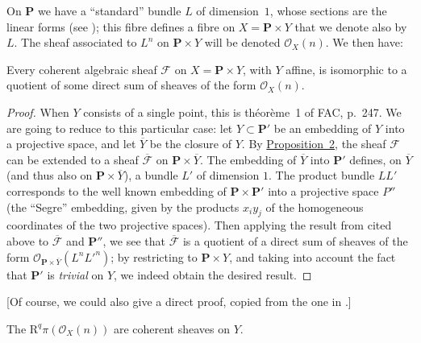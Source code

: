 \documentclass{article}
\theoremstyle{plain}
\newenvironment{lemma}[1]
    {\renewcommand\theinnerlemma{#1}\innerlemma}
    {\endinnerlemma}
\theoremstyle{definition}
\newcommand{\scr}[1]{{\mathscr{#1}}}
\newcommand{\RR}{\mathrm{R}}
\newcommand{\PP}{\mathbf{P}}
\begin{document}
On $\PP$ we have a ``standard'' bundle $L$ of dimension~$1$, whose sections are the linear forms (see \cite[chap.~III, \S~2]{12});
this fibre defines a fibre on $X=\PP\times Y$ that we denote also by $L$.
The sheaf associated to $L^n$ on $\PP\times Y$ will be denoted $\scr{O}_X(n)$.
We then have:

\begin{lemma}{6}
\label{lemma6}
  Every coherent algebraic sheaf $\scr{F}$ on $X=\PP\times Y$, with $Y$ affine, is isomorphic to a quotient of some direct sum of sheaves of the form $\scr{O}_X(n)$.
\end{lemma}

\begin{proof}
  When $Y$ consists of a single point, this is th\'{e}or\`{e}me~1 of FAC, p.~247.  
  We are going to reduce to this particular case: let $Y\subset\PP'$ be an embedding of $Y$ into a projective space, and let $\overline{Y}$ be the closure of $Y$.
  By \hyperref[proposition2]{Proposition~2}, the sheaf $\scr{F}$ can be extended to a sheaf $\overline{\scr{F}}$ on $\PP\times\overline{Y}$.
  The embedding of $\overline{Y}$ into $\PP'$ defines, on $\overline{Y}$ (and thus also on $\PP\times\overline{Y}$), a bundle $L'$ of dimension $1$.
  The product bundle $LL'$ corresponds to the well known embedding of $\PP\times\PP'$ into a projective space $P''$ (the ``Segre'' embedding, given by the products $x_i y_j$ of the homogeneous coordinates of the two projective spaces).
  Then applying the result from \cite{12} cited above to $\overline{\scr{F}}$ and $\PP''$, we see that $\overline{\scr{F}}$ is a quotient of a direct sum of sheaves of the form $\scr{O}_{\PP\times\overline{Y}}(L^nL'^n)$;
  by restricting to $\PP\times Y$, and taking into account the fact that $\PP'$ is \emph{trivial} on $Y$, we indeed obtain the desired result.
\end{proof}

  [Of course, we could also give a direct proof, copied from the one in \cite{12}.]

\begin{lemma}{7}
\label{lemma7}
  The $\RR^q\pi(\scr{O}_X(n))$ are coherent sheaves on $Y$.
\end{lemma}
\end{document}
